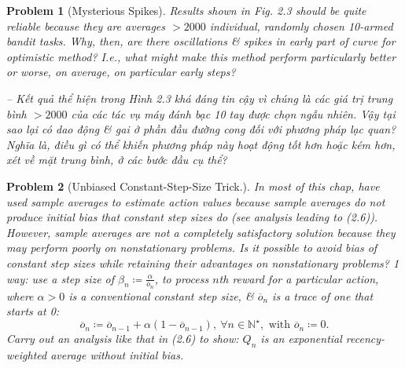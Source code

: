 \documentclass{article}
\newtheorem{problem}{Problem}
\begin{document}
\begin{itemize}
\begin{itemize}
        \begin{problem}[Mysterious Spikes]
            Results shown in Fig. 2.3 should be quite reliable because they are averages $> 2000$ individual, randomly chosen 10-armed bandit tasks. Why, then, are there oscillations \& spikes in early part of curve for optimistic method? I.e., what might make this method perform particularly better or worse, on average, on particular early steps?

            -- Kết quả thể hiện trong Hình 2.3 khá đáng tin cậy vì chúng là các giá trị trung bình $> 2000$ của các tác vụ máy đánh bạc 10 tay được chọn ngẫu nhiên. Vậy tại sao lại có dao động \& gai ở phần đầu đường cong đối với phương pháp lạc quan? Nghĩa là, điều gì có thể khiến phương pháp này hoạt động tốt hơn hoặc kém hơn, xét về mặt trung bình, ở các bước đầu cụ thể?
        \end{problem}

        \begin{problem}[Unbiased Constant-Step-Size Trick.]
            In most of this chap, have used sample averages to estimate action values because sample averages do not produce initial bias that constant step sizes do (see analysis leading to (2.6)). However, sample averages are not a completely satisfactory solution because they may perform poorly on nonstationary problems. Is it possible to avoid bias of constant step sizes while retaining their advantages on nonstationary problems? 1 way: use a step size of $\beta_n\coloneqq\frac{\alpha}{\overline{o}_n}$, to process $n$th reward for a particular action, where $\alpha > 0$ is a conventional constant step size, \& $\overline{o}_n$ is a trace of one that starts at 0:
            \begin{equation*}
                \overline{o}_n\coloneqq\overline{o}_{n-1} + \alpha(1 - \overline{o}_{n-1}),\ \forall n\in\mathbb{N}^\star,\mbox{ with }\overline{o}_n\coloneqq0.
            \end{equation*}
            Carry out an analysis like that in (2.6) to show: $Q_n$ is an exponential recency-weighted average {\rm without initial bias}.


\end{problem}
\end{itemize}
\end{itemize}
\end{document}
